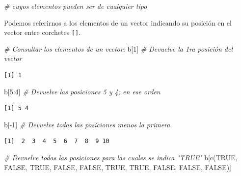 \documentclass[
  12pt,
  spanish,
]{book}
\newenvironment{Shaded}{\begin{snugshade}}{\end{snugshade}}
\newcommand{\CommentTok}[1]{\textcolor[rgb]{0.56,0.35,0.01}{\textit{#1}}}
\newcommand{\ConstantTok}[1]{\textcolor[rgb]{0.00,0.00,0.00}{#1}}
\newcommand{\DecValTok}[1]{\textcolor[rgb]{0.00,0.00,0.81}{#1}}
\newcommand{\FunctionTok}[1]{\textcolor[rgb]{0.00,0.00,0.00}{#1}}
\newcommand{\NormalTok}[1]{#1}
\newcommand{\SpecialCharTok}[1]{\textcolor[rgb]{0.00,0.00,0.00}{#1}}
\begin{document}
\begin{Shaded}
\begin{Highlighting}[]
\CommentTok{\#   cuyos elementos pueden ser de cualquier tipo}
\end{Highlighting}
\end{Shaded}

Podemos referirnos a los elementos de un vector indicando su posición en el vector entre corchetes \texttt{{[}{]}}.

\begin{Shaded}
\begin{Highlighting}[]
\CommentTok{\# Consultar los elementos de un vector:}
\NormalTok{b[}\DecValTok{1}\NormalTok{] }\CommentTok{\# Devuelve la 1ra posición del vector}
\end{Highlighting}
\end{Shaded}

\begin{verbatim}
[1] 1
\end{verbatim}

\begin{Shaded}
\begin{Highlighting}[]
\NormalTok{b[}\DecValTok{5}\SpecialCharTok{:}\DecValTok{4}\NormalTok{] }\CommentTok{\# Devuelve las posiciones 5 y 4; en ese orden}
\end{Highlighting}
\end{Shaded}

\begin{verbatim}
[1] 5 4
\end{verbatim}

\begin{Shaded}
\begin{Highlighting}[]
\NormalTok{b[}\SpecialCharTok{{-}}\DecValTok{1}\NormalTok{] }\CommentTok{\# Devuelve todas las posiciones menos la primera}
\end{Highlighting}
\end{Shaded}

\begin{verbatim}
[1]  2  3  4  5  6  7  8  9 10
\end{verbatim}

\begin{Shaded}
\begin{Highlighting}[]
\CommentTok{\# Devuelve todas las posiciones para las cuales se indica "TRUE"}
\NormalTok{b[}\FunctionTok{c}\NormalTok{(}\ConstantTok{TRUE}\NormalTok{, }\ConstantTok{FALSE}\NormalTok{, }\ConstantTok{TRUE}\NormalTok{, }\ConstantTok{FALSE}\NormalTok{, }\ConstantTok{FALSE}\NormalTok{, }\ConstantTok{TRUE}\NormalTok{, }\ConstantTok{TRUE}\NormalTok{, }\ConstantTok{FALSE}\NormalTok{, }\ConstantTok{FALSE}\NormalTok{, }\ConstantTok{FALSE}\NormalTok{)]}
\end{Highlighting}
\end{Shaded}
\end{document}
